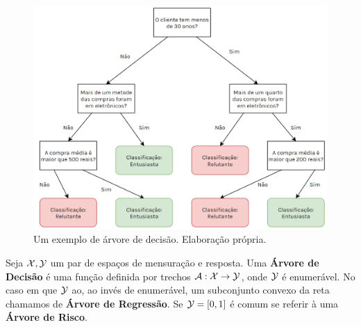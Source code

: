 \begin{figure}
    \centering
    \includegraphics[scale = .55]{imagens/arvore.png}
    \caption{Um exemplo de árvore de decisão. Elaboração própria.}
    \label{fig:arvore}
\end{figure}


\begin{defi}
Seja $\mathcal{X}, \mathcal{Y}$ um par de espaços de mensuração e resposta. Uma \textbf{Árvore de Decisão} é uma função definida por trechos $\mathcal{A}: \mathcal{X} \to \mathcal{Y}$, onde $\mathcal{Y}$ é enumerável. No caso em que $\mathcal{Y}$ ao, ao invés de enumerável, um subconjunto convexo da reta chamamos de \textbf{Árvore de Regressão}. Se $\mathcal{Y} = [0, 1]$ é comum se referir à uma \textbf{Árvore de Risco}.
\end{defi}



